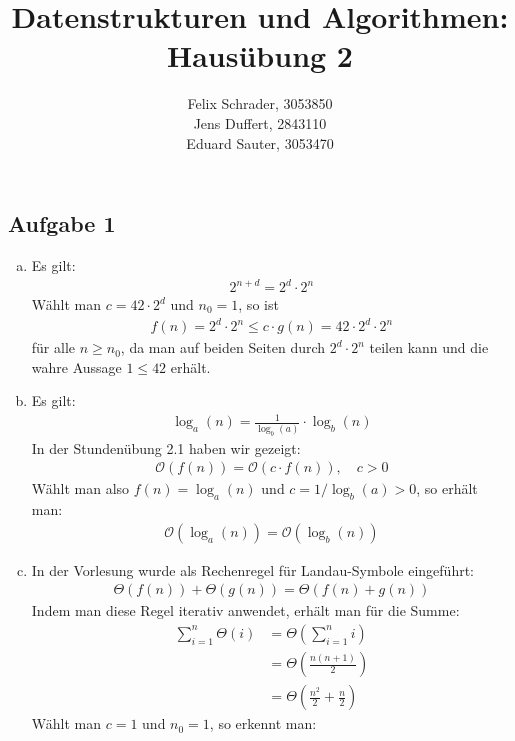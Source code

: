 \documentclass[11pt]{article}
\author{
  Felix Schrader, 3053850 \\ 
  Jens Duffert, 2843110 \\
  Eduard Sauter, 3053470
}
\title{Datenstrukturen und Algorithmen: Haus\"ubung 2}
\begin{document}
\maketitle

\subsection*{Aufgabe 1}

\begin{enumerate}[a)]
  \item Es gilt:
    \begin{align*}
      2^{n+d} = 2^d \cdot 2^n
    \end{align*}
    Wählt man $c = 42 \cdot 2^d$ und $n_0 = 1$, so ist
    \begin{align*}
      f(n)=2^d \cdot 2^n \leq c \cdot g(n) = 42 \cdot 2^d \cdot 2^n
    \end{align*}
    für alle $n \geq n_0$, da man auf beiden Seiten durch $2^d \cdot 2^n$ teilen
    kann und die wahre Aussage $1 \leq 42$ erhält.
  \item Es gilt:
    \begin{align*}
      \log_a (n) = \frac{1}{\log_b (a)} \cdot \log_b (n)
    \end{align*}
    In der Stundenübung 2.1 haben wir gezeigt:
    \begin{align*}
      \mathcal{O}(f(n)) = \mathcal{O}(c \cdot f(n)), \quad c > 0
    \end{align*}
    Wählt man also $f(n) = \log_a (n)$ und $c = 1/\log_b (a) > 0$, so
    erhält man:
    \begin{align*}
      \mathcal{O}(\log_a (n)) = \mathcal{O}(\log_b (n))
    \end{align*}
  \item In der Vorlesung wurde als Rechenregel für Landau-Symbole eingeführt:
    \begin{align*}
      \Theta (f(n)) + \Theta (g(n)) = \Theta (f(n)+g(n))
    \end{align*}
    Indem man diese Regel iterativ anwendet, erhält man für die Summe:
    \begin{align*}
      \sum_{i=1}^n \Theta (i) &= \Theta \left(\sum_{i=1}^n i\right)
      \\ &= \Theta \left(\frac{n(n+1)}{2}\right)
      \\ &= \Theta \left(\frac{n^2}{2} + \frac{n}{2}\right)
    \end{align*}
    Wählt man $c = 1$ und $n_0 = 1$, so erkennt man:
    \begin{align*}

\end{align*}
\end{enumerate}
\end{document}
